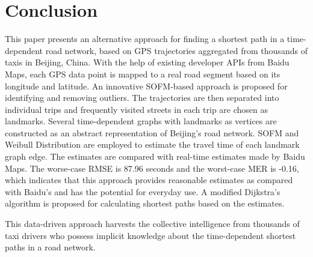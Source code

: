\chapter{Conclusion}\label{Chap:6}

This paper presents an alternative approach for finding a shortest path in a time-dependent road network, based on GPS trajectories aggregated from thousands of taxis in Beijing, China. With the help of existing developer APIs from Baidu Maps, each GPS data point is mapped to a real road segment based on its longitude and latitude. An innovative SOFM-based approach is proposed for identifying and removing outliers. The trajectories are then separated into individual trips and frequently visited streets in each trip are chosen as landmarks. Several time-dependent graphs with landmarks as vertices are constructed as an abstract representation of Beijing's road network. SOFM and Weibull Distribution are employed to estimate the travel time of each landmark graph edge. The estimates are compared with real-time estimates made by Baidu Maps. The worse-case RMSE is 87.96 seconds and the worst-case MER is -0.16, which indicates that this approach provides reasonable estimates as compared with Baidu's and has the potential for everyday use. A modified Dijkstra's algorithm is proposed for calculating shortest paths based on the estimates. 

This data-driven approach harvests the collective intelligence from thousands of taxi drivers who possess implicit knowledge about the time-dependent shortest paths in a road network. 